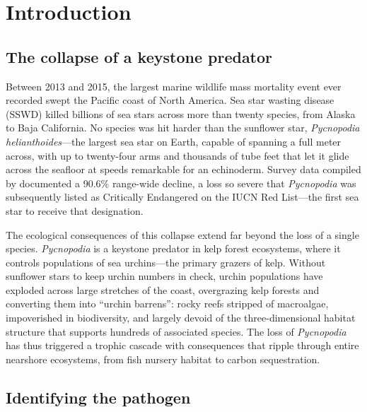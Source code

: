 
\section{Introduction}
\label{sec:introduction}

\subsection{The collapse of a keystone predator}

Between 2013 and 2015, the largest marine wildlife mass mortality event ever recorded
swept the Pacific coast of North America. Sea star wasting disease (SSWD) killed
billions of sea stars across more than twenty species, from Alaska to Baja California.
No species was hit harder than the sunflower star, \textit{Pycnopodia helianthoides}---the
largest sea star on Earth, capable of spanning a full meter across, with up to
twenty-four arms and thousands of tube feet that let it glide across the seafloor at
speeds remarkable for an echinoderm. Survey data compiled by \citet{gravem2021}
documented a 90.6\% range-wide decline, a loss so severe that \textit{Pycnopodia} was
subsequently listed as Critically Endangered on the IUCN Red List---the first sea star
to receive that designation.

The ecological consequences of this collapse extend far beyond the loss of a single
species. \textit{Pycnopodia} is a keystone predator in kelp forest ecosystems, where it
controls populations of sea urchins---the primary grazers of kelp. Without sunflower
stars to keep urchin numbers in check, urchin populations have exploded across large
stretches of the coast, overgrazing kelp forests and converting them into ``urchin
barrens'': rocky reefs stripped of macroalgae, impoverished in biodiversity, and
largely devoid of the three-dimensional habitat structure that supports hundreds of
associated species. The loss of \textit{Pycnopodia} has thus triggered a trophic cascade
with consequences that ripple through entire nearshore ecosystems, from fish nursery
habitat to carbon sequestration.

\subsection{Identifying the pathogen}

